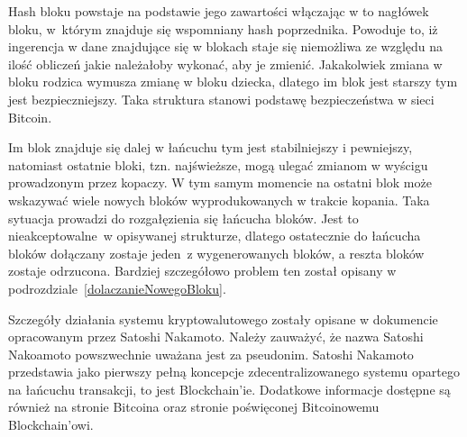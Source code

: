 \documentclass[12pt, twoside, final, openany]{mgr}
\begin{document}
\indent Hash bloku powstaje na podstawie jego zawartości włączając w to nagłówek bloku, w~którym znajduje się wspomniany hash poprzednika. Powoduje to, iż ingerencja w dane znajdujące się w blokach staje się niemożliwa ze względu na ilość obliczeń jakie należałoby wykonać, aby je zmienić. Jakakolwiek zmiana w bloku rodzica wymusza zmianę w bloku dziecka, dlatego im blok jest starszy tym jest bezpieczniejszy. Taka struktura stanowi podstawę bezpieczeństwa w sieci Bitcoin.

\indent Im blok znajduje się dalej w łańcuchu tym jest stabilniejszy i pewniejszy, natomiast ostatnie bloki, tzn. najświeższe, mogą ulegać zmianom w wyścigu prowadzonym przez kopaczy. W tym samym momencie na ostatni blok może wskazywać wiele nowych bloków wyprodukowanych w trakcie kopania. Taka sytuacja prowadzi do rozgałęzienia się łańcucha bloków. Jest to nieakceptowalne~w opisywanej strukturze, dlatego ostatecznie do łańcucha bloków dołączany zostaje jeden~z wygenerowanych bloków, a reszta bloków zostaje odrzucona. Bardziej szczegółowo problem ten został opisany w podrozdziale~\ref{dolaczanieNowegoBloku}.

\indent Szczegóły działania systemu kryptowalutowego zostały opisane w dokumencie opracowanym przez Satoshi Nakamoto\cite{nakamoto2008bitcoin}. Należy zauważyć, że nazwa Satoshi Nakoamoto powszwechnie uważana jest za pseudonim\cite{satoshi}. Satoshi Nakamoto przedstawia jako pierwszy pełną koncepcje zdecentralizowanego  systemu opartego na łańcuchu transakcji, to jest Blockchain'ie. Dodatkowe informacje dostępne są również na stronie Bitcoina oraz stronie poświęconej Bitcoinowemu Blockchain'owi\cite{blockchaininfo, bitcoinorg}.
\end{document}
